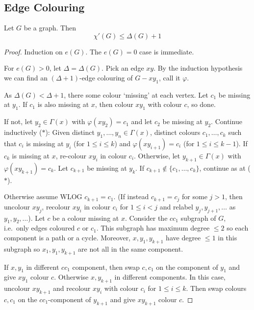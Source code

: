 \documentclass{article}
\begin{document}
\subsection{Edge Colouring}




\begin{nthm}\label{thm:30}
    Let $G$ be a graph. Then
    \begin{equation*}
        \chi'(G) \leq \Delta(G) + 1
    \end{equation*}
\end{nthm}
\begin{proof}
    Induction on $e(G)$. The $e(G) = 0$ case is immediate.

    For $e(G) > 0$, let $\Delta = \Delta(G)$. Pick an edge $xy$.
    By the induction hypothesis we can find an $(\Delta+1)$-edge colouring of $G - x y_1$, call it $\varphi$.

    As $\Delta(G) < \Delta + 1$, there some colour `missing' at each vertex.
    Let $c_1$ be missing at $y_1$. If $c_1$ is also missing at $x$, then colour $xy_1$ with colour $c$, so done.

    If not, let $y_2 \in \Gamma(x)$ with $\varphi(x y_2) = c_1$ and let $c_2$ be missing at $y_2$.
    Continue inductively ($*$):
    Given distinct $y_1, \dotsc, y_n \in \Gamma(x)$, distinct colours $c_1, \dotsc, c_k$ such that $c_i$ is missing at $y_i$ (for $1 \leq i \leq k$) and $\varphi(x y_{i+1}) = c_i$ (for $1 \leq i \leq k-1$).
    If $c_k$ is missing at $x$, re-colour $xy_i$ in colour $c_i$.
    Otherwise, let $y_{k+1} \in \Gamma(x)$ with $\varphi(x y_{k+1}) = c_k$.
    Let $c_{k+1}$ be missing at $y_k$. If $c_{k+1} \notin \{c_1, \dotsc, c_k\}$, continue as at ($*$).

    Otherwise assume WLOG $c_{k+1} = c_1$. (If instead $c_{k+1} = c_j$ for some $j > 1$, then uncolour $xy_j$, recolour $x y_i$ in colour $c_i$ for $1 \leq i < j$ and relabel $y_j, y_{j+1}, \dotsc$ as $y_1, y_2, \dotsc$).
    Let $c$ be a colour missing at $x$.
    Consider the $cc_1$ subgraph of $G$, i.e.\ only edges coloured $c$ or $c_1$.
    This subgraph has maximum degree $\leq 2$ so each component is a path or a cycle.
    Moreover, $x,y_1,y_{k+1}$ have degree $\leq 1$ in this subgraph so $x_1, y_1, y_{k+1}$ are not all in the same component.

    If $x,y_1$ in different $c c_1$ component, then swap $c,c_1$ on the component of $y_1$ and give $x y_1$ colour $c$.
    Otherwise $x, y_{k+1}$ in different components. In this case, uncolour $x y_{k+1}$ and recolour $x y_i$ with colour $c_i$ for $1 \leq i \leq k$.
    Then swap colours $c,c_1$ on the $c c_1$-component of $y_{k+1}$ and give $x y_{k+1}$ colour $c$.
\end{proof}
\clearpage
\end{document}
